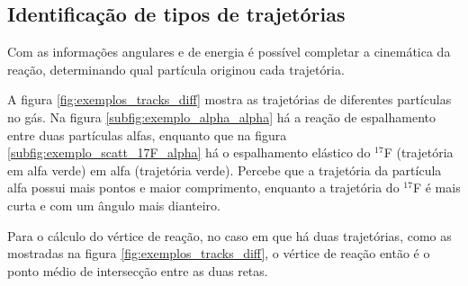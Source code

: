 \documentclass[a4paper,12pt,oneside]{book}
\begin{document}
\subsection{Identificação de tipos de trajetórias}

\par Com as informações angulares e de energia é possível completar a cinemática da reação, determinando qual partícula originou cada trajetória.

\par A figura \ref{fig:exemplos_tracks_diff} mostra as trajetórias de diferentes partículas no gás. Na figura \ref{subfig:exemplo_alpha_alpha} há a reação de espalhamento entre duas partículas alfas, enquanto que na figura \ref{subfig:exemplo_scatt_17F_alpha} há o espalhamento elástico do $^{17}$F (trajetória em alfa verde) em alfa (trajetória verde). Percebe que a trajetória da partícula alfa possui mais pontos e maior comprimento, enquanto a trajetória do $^{17}$F é mais curta e com um ângulo mais dianteiro.

\par Para o cálculo do vértice de reação, no caso em que há duas trajetórias, como as mostradas na figura \ref{fig:exemplos_tracks_diff}, o vértice de reação então é o ponto médio de intersecção entre as duas retas.


%
\end{document}
